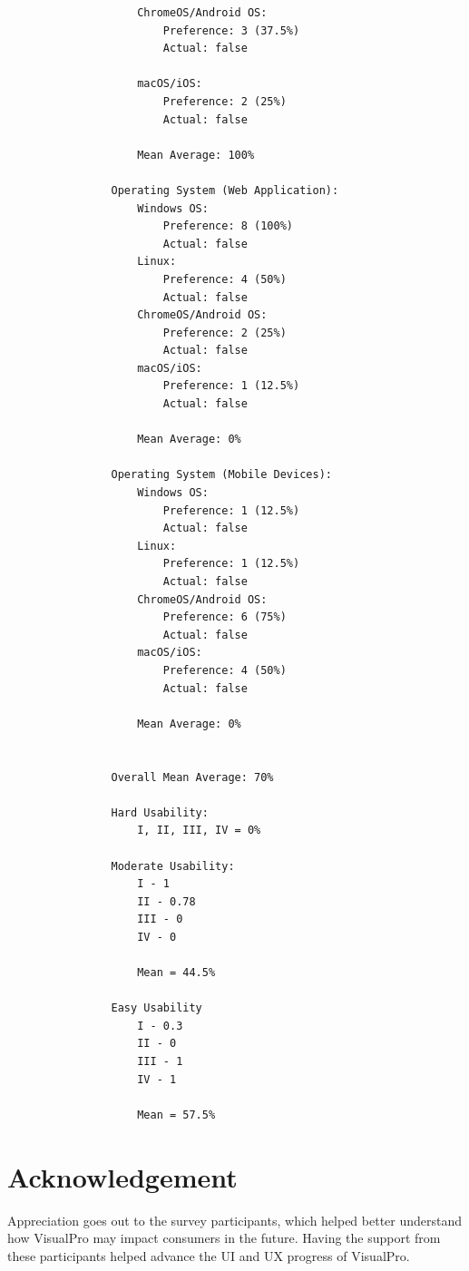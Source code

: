 \documentclass[12pt]{report} %
\begin{document}
\begin{lstlisting}
					ChromeOS/Android OS: 
						Preference: 3 (37.5%)
						Actual: false
						
					macOS/iOS:
						Preference: 2 (25%)
						Actual: false
					
					Mean Average: 100%
					
				Operating System (Web Application):
					Windows OS:
						Preference: 8 (100%)
						Actual: false
					Linux:
						Preference: 4 (50%)
						Actual: false
					ChromeOS/Android OS:
						Preference: 2 (25%)
						Actual: false
					macOS/iOS:
						Preference: 1 (12.5%)
						Actual: false
						
					Mean Average: 0%

				Operating System (Mobile Devices):
					Windows OS:
						Preference: 1 (12.5%)
						Actual: false
					Linux:
						Preference: 1 (12.5%)
						Actual: false
					ChromeOS/Android OS:
						Preference: 6 (75%)
						Actual: false
					macOS/iOS:
						Preference: 4 (50%)
						Actual: false
						
					Mean Average: 0%
					

				Overall Mean Average: 70%

				Hard Usability:
					I, II, III, IV = 0%

				Moderate Usability:
					I - 1
					II - 0.78
					III - 0
					IV - 0

					Mean = 44.5%

				Easy Usability
					I - 0.3
					II - 0
					III - 1
					IV - 1

					Mean = 57.5%
			\end{lstlisting}
	\chapter*{Acknowledgement}
		Appreciation goes out to the survey participants, which helped better understand how VisualPro may impact consumers in the future. Having the support from these participants helped advance the UI and UX progress of VisualPro.

\clearpage
\nocite{*}
\small{
}


\end{document}
